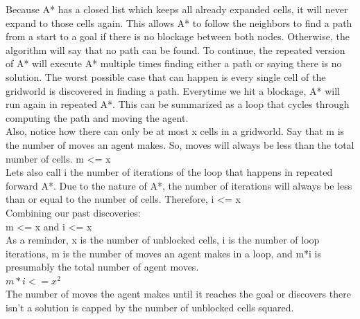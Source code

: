 \documentclass[a4paper]{article}
\theoremstyle{definition}
\theoremstyle{plain}
\begin{document}
Because A* has a closed list which keeps all already expanded cells, it will never expand to those cells again. This allows A* to follow the neighbors to find a path from a start to a goal if there is no blockage between both nodes. Otherwise, the algorithm will say that no path can be found. To continue, the repeated version of A* will execute A* multiple times finding either a path or saying there is no solution. The worst possible case that can happen is every single cell of the gridworld is discovered in finding a path. Everytime we hit a blockage, A* will run again in repeated A*. This can be summarized as a loop that cycles through computing the path and moving the agent. \\
Also, notice how there can only be at most x cells in a gridworld. Say that m is the number of moves an agent makes. So, moves will always be less than the total number of cells. m <= x\\
Lets also call i the number of iterations of the loop that happens in repeated forward A*. Due to the nature of A*, the number of iterations will always be less than or equal to the number of cells. Therefore, i <= x\\
Combining our past discoveries:\\
m <= x and i <= x \\
As a reminder, x is the number of unblocked cells, i is the number of loop iterations, m is the number of moves an agent makes in a loop, and m*i is presumably the total number of agent moves.\\
$m*i <= x^2$\\
The number of moves the agent makes until it reaches the goal or discovers there isn’t a solution is capped by the number of unblocked cells squared. 
\end{document}
